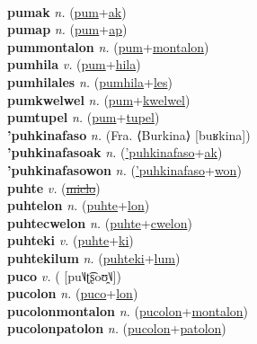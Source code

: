  \label{pumalon} \\
\textbf{pumak} \textit{n.} (\hyperref[pum]{pum}+\hyperref[ak]{ak})
 \label{pumak} \\
\textbf{pumap} \textit{n.} (\hyperref[pum]{pum}+\hyperref[ap]{ap})
 \label{pumap} \\
\textbf{pummontalon} \textit{n.} (\hyperref[pum]{pum}+\hyperref[montalon]{montalon})
 \label{pummontalon} \\
\textbf{pumhila} \textit{v.} (\hyperref[pum]{pum}+\hyperref[hila]{hila})
 \label{pumhila} \\
\textbf{pumhilales} \textit{n.} (\hyperref[pumhila]{pumhila}+\hyperref[les]{les})
 \label{pumhilales} \\
\textbf{pumkwelwel} \textit{n.} (\hyperref[pum]{pum}+\hyperref[kwelwel]{kwelwel})
 \label{pumkwelwel} \\
\textbf{pumtupel} \textit{n.} (\hyperref[pum]{pum}+\hyperref[tupel]{tupel})
 \label{pumtupel} \\
\textbf{'puhkinafaso} \textit{n.} (Fra. ⟨Burkina⟩ [buʁkina])
 \label{'puhkinafaso} \\
\textbf{'puhkinafasoak} \textit{n.} (\hyperref['puhkinafaso]{'puhkinafaso}+\hyperref[ak]{ak})
 \label{'puhkinafasoak} \\
\textbf{'puhkinafasowon} \textit{n.} (\hyperref['puhkinafaso]{'puhkinafaso}+\hyperref[won]{won})
 \label{'puhkinafasowon} \\
\textbf{puhte} \textit{v.} (\hyperref[miclo]{\sout{miclo}})
 \label{puhte} \\
\textbf{puhtelon} \textit{n.} (\hyperref[puhte]{puhte}+\hyperref[lon]{lon})
 \label{puhtelon} \\
\textbf{puhtecwelon} \textit{n.} (\hyperref[puhte]{puhte}+\hyperref[cwelon]{cwelon})
 \label{puhtecwelon} \\
\textbf{puhteki} \textit{v.} (\hyperref[puhte]{puhte}+\hyperref[ki]{ki})
 \label{puhteki} \\
\textbf{puhtekilum} \textit{n.} (\hyperref[puhteki]{puhteki}+\hyperref[lum]{lum})
 \label{puhtekilum} \\
\textbf{puco} \textit{v.} ( [pu˥˩ʈ͡ʂoʊ̯˥˩])
 \label{puco} \\
\textbf{pucolon} \textit{n.} (\hyperref[puco]{puco}+\hyperref[lon]{lon})
 \label{pucolon} \\
\textbf{pucolonmontalon} \textit{n.} (\hyperref[pucolon]{pucolon}+\hyperref[montalon]{montalon})
 \label{pucolonmontalon} \\
\textbf{pucolonpatolon} \textit{n.} (\hyperref[pucolon]{pucolon}+\hyperref[patolon]{patolon})

